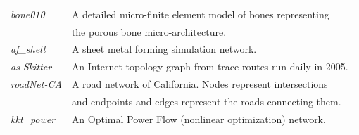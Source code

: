 \begin{table}[t]
\begin{tabular}{ll}
{\it bone010} \cite{vanRietbergen199569} &
A detailed micro-finite element model of bones representing \\
& the porous bone micro-architecture. \\ \hline
{\it af\_shell} \cite{Davis97theuniversity}  & A sheet metal forming simulation network. \\ \hline
{\it as-Skitter} \cite{Leskovec:2005:GOT:1081870.1081893} & An Internet topology graph from trace routes run daily in 2005. \\ \hline %
{\it roadNet-CA} \cite{Leskovec:2005:GOT:1081870.1081893} & A road network of California.
Nodes represent intersections \\ & and endpoints and edges represent the roads connecting them. \\ \hline %
{\it kkt\_power} \cite{Davis97theuniversity} & An Optimal Power Flow (nonlinear optimization) network. \\\hline
\end{tabular}
\end{table}

